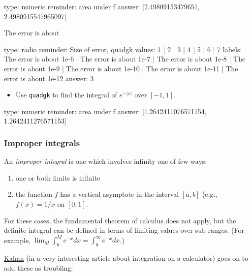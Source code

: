 \documentclass[12pt]{article}
\begin{document}
\begin{answer}
    type: numeric
    reminder: area under f
    answer: [2.49809153479651, 2.4980915547965097]

\end{answer}

The error is about

\begin{answer}
type: radio
reminder: Size of error, quadgk
values: 1 | 2 | 3 | 4 | 5 | 6 | 7
labels: The error is about 1e-6 | The error is about 1e-7 | The error is about 1e-8 | The error is about 1e-9 | The error is about 1e-10 | The error is about 1e-11 | The error is about 1e-12
answer: 3
\end{answer}

\begin{itemize}
\itemsep1pt\parskip0pt
\item
  Use \texttt{quadgk} to find the integral of $e^{-\vert x\vert }$ over
  $[-1,1]$.
\end{itemize}

\begin{answer}
    type: numeric
    reminder: area under f
    answer: [1.2642411076571154, 1.2642411276571153]

\end{answer}

\subsubsection{Improper integrals}

An \emph{improper integral} is one which involves infinity one of few
ways:

\begin{enumerate}
\def\labelenumi{\arabic{enumi})}
\item
  one or both limits is infinite
\item
  the function $f$ has a vertical asymptote in the interval $[a,b]$
  (e.g., $f(x) = 1/x$ on $[0,1]$.
\end{enumerate}

For these cases, the fundamental theorem of calculus does not apply, but
the definite integral can be defined in terms of limiting values over
sub-ranges. (For example,
$\lim_{M} \int_0^M e^{-x} dx = \int_0^\infty e^{-x} dx$.)

\href{http://www.hpl.hp.com/hpjournal/pdfs/IssuePDFs/1980-08.pdf}{Kahan}
(in a very interesting article about integration on a calculator) goes
on to add these as troubling:
\end{document}

